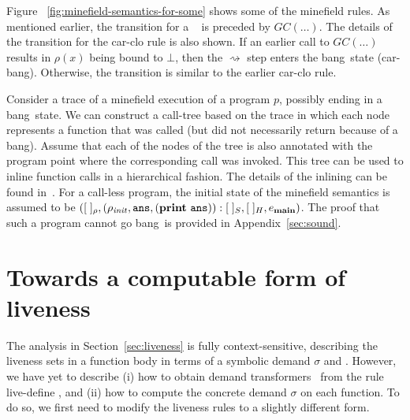 \documentclass[9pt,nonatbib]{sigplanconf}
\newcommand{\bang}{\mbox{\sc bang}}
\begin{document}
Figure ~\ref{fig:minefield-semantics-for-some} shows some of the
minefield rules. As mentioned earlier, the transition for a \LET\ 
is preceded  by $GC(\ldots)$.  The details of the transition for the {\sc
  car-clo}  rule   is  also shown.  If    an
earlier  call to  $GC(\ldots)$  results  in $\rho(x)$  being
bound  to  $\bot$,  then  the  $\rightsquigarrow$  step
enters the  \bang\ state ({\sc  car-bang}). Otherwise,
the transition is similar to the earlier {\sc car-clo}
rule. 

Consider a trace  of a minefield execution of a  program $p$, possibly
ending in  a \bang\ state. We  can construct a call-tree  based on the
trace in  which each node represents  a function that was  called (but
did not necessarily  return because of a \bang).  Assume  that each of
the nodes of  the tree is also annotated with  the program point where
the corresponding call  was invoked.  This tree can be  used to inline
function calls in a hierarchical fashion.  The details of the inlining
can be found in~\cite{asati14lgc}.
For  a
call-less program,  the initial state of  the minefield
semantics  is  assumed  to  be  $([\;]_\rho,(\rho_\mathit{init},
\mathbf{\mbox{\tt ans}},      (\mathbf{print}~\mathbf{\mbox{\tt ans}})):[\;]_{S}     ,      [\;]_{H},
e_{\mathbf{main}})$. The proof that such a program cannot go \bang\ is provided
in Appendix~\ref{sec:sound}.
   
 




\section{Towards a  computable form of liveness}\label{sec:computing}
The analysis in Section~\ref{sec:liveness} is fully context-sensitive, 
describing the  liveness sets  in a function body in
terms of a symbolic demand $\sigma$  and \Lfonly. However, we have yet to
describe (i) how to obtain demand transformers \Lfonly\ from the rule
{\sc live-define} , and (ii) how to compute the concrete demand $\sigma$ on
each function. To do so, we first need to modify the liveness rules
to a slightly different form.
\end{document}
